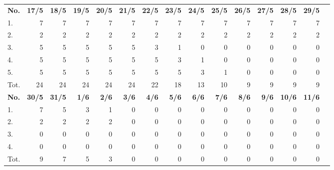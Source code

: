 \documentclass{article}
\begin{document}
\begin{table}[H]
    \centering
    \begin{tabularx}{\textwidth}{| X | r | r | r | r | r | r | r | r | r | r | r | r | r | r |}
        \Xhline{2pt}
        \textbf{No.} & \textbf{17/5} & \textbf{18/5} & \textbf{19/5} & \textbf{20/5} & \textbf{21/5} & \textbf{22/5} & \textbf{23/5} & \textbf{24/5} & \textbf{25/5} & \textbf{26/5} & \textbf{27/5} & \textbf{28/5} & \textbf{29/5} \\
        \Xhline{2pt}
        1. & 7 & 7 & 7 & 7 & 7 & 7 & 7 & 7 & 7 & 7 & 7 & 7 & 7 \\
        \hline
        2. & 2 & 2 & 2 & 2 & 2 & 2 & 2 & 2 & 2 & 2 & 2 & 2 & 2 \\
        \hline
        3. & 5 & 5 & 5 & 5 & 5 & 3 & 1 & 0 & 0 & 0 & 0 & 0 & 0 \\
        \hline
        4. & 5 & 5 & 5 & 5 & 5 & 5 & 3 & 1 & 0 & 0 & 0 & 0 & 0 \\
        \hline
        5. & 5 & 5 & 5 & 5 & 5 & 5 & 5 & 3 & 1 & 0 & 0 & 0 & 0 \\
        \hline
        Tot. & 24 & 24 & 24 & 24 & 24 & 22 & 18 & 13 & 10 & 9 & 9 & 9 & 9 \\
        \Xhline{2pt}
        \textbf{No.} & \textbf{30/5} & \textbf{31/5} & \textbf{ 1/6} & \textbf{ 2/6} & \textbf{ 3/6} & \textbf{ 4/6} & \textbf{ 5/6} & \textbf{ 6/6} & \textbf{ 7/6} & \textbf{ 8/6} & \textbf{ 9/6} & \textbf{10/6} & \textbf{11/6} \\
        \Xhline{2pt}
        1. & 7 & 5 & 3 & 1 & 0 & 0 & 0 & 0 & 0 & 0 & 0 & 0 & 0 \\
        \hline
        2. & 2 & 2 & 2 & 2 & 0 & 0 & 0 & 0 & 0 & 0 & 0 & 0 & 0 \\
        \hline
        3. & 0 & 0 & 0 & 0 & 0 & 0 & 0 & 0 & 0 & 0 & 0 & 0 & 0 \\
        \hline
        4. & 0 & 0 & 0 & 0 & 0 & 0 & 0 & 0 & 0 & 0 & 0 & 0 & 0 \\
        \hline
        Tot. & 9 & 7 & 5 & 3 & 0 & 0 & 0 & 0 & 0 & 0 & 0 & 0 & 0 \\
        \hline
    \end{tabularx}
\end{table}

\clearpage
\end{document}

